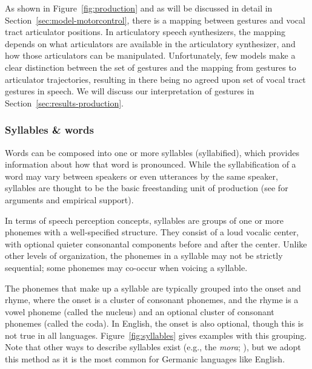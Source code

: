 As shown in Figure~\ref{fig:production}
and as will be discussed in detail
in Section~\ref{sec:model-motorcontrol},
there is a mapping
between gestures and
vocal tract articulator positions.
In articulatory speech synthesizers,
the mapping depends on what articulators
are available in the articulatory synthesizer,
and how those articulators can be manipulated.
Unfortunately, few models make a clear distinction
between the set of gestures
and the mapping from gestures
to articulator trajectories,
resulting in there being
no agreed upon set of vocal tract gestures
in speech.
We will discuss our interpretation
of gestures in Section~\ref{sec:results-production}.

\subsubsection{Syllables \& words}

Words can be composed into one or more syllables
(syllabified),
which provides information about
how that word is pronounced.
While the syllabification of a word
may vary between speakers
or even utterances by the same speaker,
syllables are thought to be the
basic freestanding unit of production
(see \citealt{levelt1994,levelt1999,cholin2004}
for arguments and empirical support).

In terms of speech perception concepts,
syllables are groups of one or more phonemes
with a well-specified structure.
They consist of a loud vocalic center,
with optional quieter consonantal components
before and after the center.
Unlike other levels of organization,
the phonemes in a syllable
may not be strictly sequential;
some phonemes may co-occur
when voicing a syllable.

The phonemes that make up a syllable
are typically grouped into
the onset and rhyme,
where the onset is a cluster of
consonant phonemes,
and the rhyme is a vowel phoneme
(called the nucleus)
and an optional cluster of consonant
phonemes (called the coda).
In English, the onset is also optional,
though this is not true in all languages.
Figure~\ref{fig:syllables} gives
examples with this grouping.
Note that other ways to describe
syllables exist
(e.g., the \textit{mora}; \citealt{otake1993}),
but we adopt this method
as it is the most common
for Germanic languages like English.


